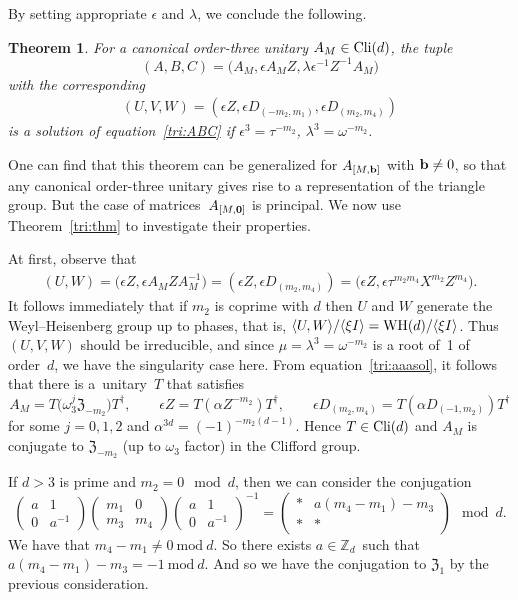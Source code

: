 \documentclass[pdftex]{sigma}
\numberwithin{equation}{section}
\newtheorem{Theorem}{Theorem}[section]
\newcommand{\la}{\langle}
\newcommand{\ra}{\rangle}
\newcommand{\mmod}{\mathrm{~mod~}}
\newcommand{\mbb}{\mathbb}
\newcommand{\bmp}{\begin{pmatrix}}
\newcommand{\emp}{\end{pmatrix}}
\begin{document}
By setting
appropriate $\epsilon$ and $\lambda$, we conclude the following.
\begin{Theorem}\label{can:thm3}
 For a canonical order-three unitary $A_M \in {\rm Cli}(d)$, the tuple
 \[
 (A,B,C) = \bigl(A_M, \epsilon A_MZ, \lambda\epsilon^{-1}Z^{-1}A_M\bigr)
 \]
 with the corresponding
\begin{gather}\label{can:UVW}
 (U,V,W) = (\epsilon Z, \epsilon D_{(-m_2,m_1)}, \epsilon D_{(m_2,m_4)})
\end{gather}
 is a solution of equation~\eqref{tri:ABC} if
 $\epsilon^3 = \tau^{-m_2}$, $\lambda^3 = \omega^{-m_2}$.
\end{Theorem}

One can find that this theorem can be generalized for $A_{[M, {\bf b}]}$ with ${\bf b} \neq 0$,
so that any canonical order-three unitary gives rise to a representation of the triangle group.
But the case of matrices~$A_{[M, {\bf 0}]}$ is principal.
We now use Theorem~\ref{tri:thm} to investigate their properties.

At first, observe that
\begin{gather}\label{can:UW}
 (U,W) = \bigl(\epsilon Z, \epsilon A_M Z A_M^{-1}\bigr)
 = (\epsilon Z, \epsilon D_{(m_2,m_4)})
 = \bigl(\epsilon Z, \epsilon \tau^{m_2m_4} X^{m_2}Z^{m_4}\bigr).
\end{gather}
It follows immediately that if $m_2$ is coprime with $d$
then $U$ and $W$ generate the Weyl--Heisenberg group up to phases,
that is, $\la U,W \ra / \la \xi I \ra = {\rm WH}(d) / \la \xi I \ra$.
Thus $(U,V,W)$ should be irreducible, and since $\mu = \lambda^3 = \omega^{-m_2}$
is a root of~1 of order~$d$, we have the singularity case here.
From equation~\eqref{tri:aaasol}, it follows that there is a~unitary~$T$
that satisfies
\[
 A_M = T\bigl(\omega_3^j \mathfrak{Z}_{-m_2}\bigr)T^\dag,
 \qquad
 \epsilon Z = T (\alpha Z^{-m_2}) T^\dag,
 \qquad
 \epsilon D_{(m_2,m_4)} = T (\alpha D_{(-1,m_2)}) T^\dag
\]
for some $j=0,1,2$ and $\alpha^{3d} = (-1)^{-m_2(d-1)}$.
Hence $T \in {\rm Cli}(d)$ and $A_M$ is conjugate to $\mathfrak{Z}_{-m_2}$
(up to $\omega_3$ factor) in the Clifford group.

If $d > 3$ is prime and $m_2 = 0 \mod d$, then we can consider the conjugation
\[
 \bmp a & 1 \\ 0 & a^{-1} \emp
 \bmp m_1 & 0 \\ m_3 & m_4 \emp
 \bmp a & 1 \\ 0 & a^{-1} \emp^{-1}
 =
 \bmp * & a(m_4-m_1)-m_3 \\ * & * \emp
 \mod d.
\]
We have that $m_4-m_1\neq0 \mmod d$. So there exists $a\in\mbb{Z}_d$~such that $a(m_4-m_1)-m_3=-1 \mmod d$.
And so we have the conjugation to $\mathfrak{Z}_{1}$ by the previous consideration.
\end{document}
